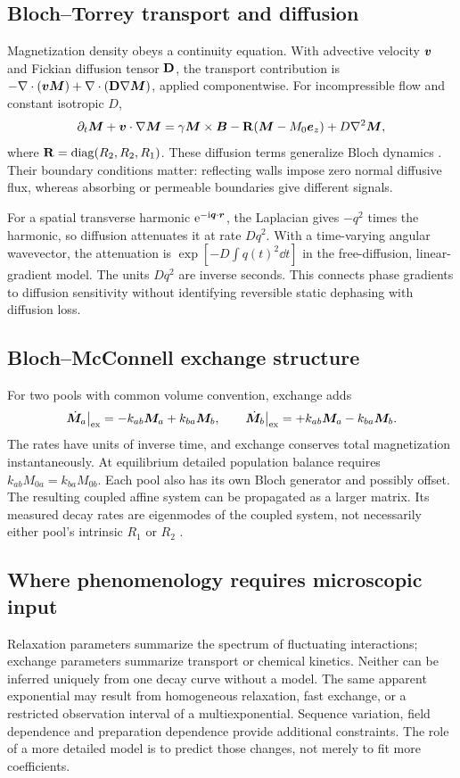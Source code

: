 \subsection{Bloch--Torrey transport and diffusion}
Magnetization density obeys a continuity equation.
With advective velocity $\bm{v}$ and Fickian diffusion tensor $\mathbf{D}$,
the transport contribution is
$-\nabla\cdot(\bm{v}\bm{M})+\nabla\cdot(\mathbf{D}\nabla\bm{M})$,
applied componentwise. For incompressible flow and constant isotropic $D$,
\begin{equation}
 \partial_t\bm{M}+\bm{v}\cdot\nabla\bm{M}
 =\gamma\bm{M}\times\bm{B}-\mathbf{R}(\bm{M}-M_0\bm{e}_z)
      +D\nabla^2\bm{M} ,
 \label{eq:03:torrey}
\end{equation}
where $\mathbf{R}=\operatorname{diag}(R_2,R_2,R_1)$.
These diffusion terms generalize Bloch dynamics \cite{torrey1956}.
Their boundary conditions matter: reflecting walls impose zero normal
diffusive flux, whereas absorbing or permeable boundaries give different
signals.

For a spatial transverse harmonic $\mathrm{e}^{-\mathrm{i}\bm{q}\cdot\bm{r}}$,
the Laplacian gives $-q^2$ times the harmonic, so diffusion attenuates
it at rate $Dq^2$. With a time-varying angular wavevector,
the attenuation is $\exp[-D\int q(t)^2\dd t]$ in the free-diffusion,
linear-gradient model. The units $Dq^2$ are inverse seconds.
This connects phase gradients to diffusion sensitivity without
identifying reversible static dephasing with diffusion loss.

\subsection{Bloch--McConnell exchange structure}
For two pools with common volume convention, exchange adds
\[
 \dot{\bm{M}}_a\big|_{\rm ex}=-k_{ab}\bm{M}_a+k_{ba}\bm{M}_b,\qquad
 \dot{\bm{M}}_b\big|_{\rm ex}=+k_{ab}\bm{M}_a-k_{ba}\bm{M}_b .
\]
The rates have units of inverse time, and exchange conserves total
magnetization instantaneously. At equilibrium detailed population
balance requires $k_{ab}M_{0a}=k_{ba}M_{0b}$.
Each pool also has its own Bloch generator and possibly offset.
The resulting coupled affine system can be propagated as a larger matrix.
Its measured decay rates are eigenmodes of the coupled system, not
necessarily either pool's intrinsic $R_1$ or $R_2$
\cite{mcconnell1958}.

\subsection{Where phenomenology requires microscopic input}
Relaxation parameters summarize the spectrum of fluctuating interactions;
exchange parameters summarize transport or chemical kinetics.
Neither can be inferred uniquely from one decay curve without a model.
The same apparent exponential may result from homogeneous relaxation,
fast exchange, or a restricted observation interval of a multiexponential.
Sequence variation, field dependence and preparation dependence provide
additional constraints. The role of a more detailed model is to predict
those changes, not merely to fit more coefficients.

